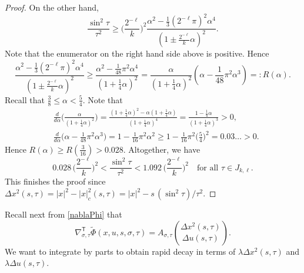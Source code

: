 \documentclass[leqno]{amsart}
\theoremstyle{definition}
\theoremstyle{remark}
\numberwithin{equation}{section}
\newcommand\la{{\lambda}}
\begin{document}
\begin{proof}
On the other hand,
\[
\frac{\sin ^2 \tau}{\tau^2 } \geq\Big(\frac{2^{-\ell}}{k}\Big)^2 \frac{\alpha^2 -\frac{1}{3}(2^{-\ell} \pi)^2 \alpha^{ 4 }}{(1 \pm \frac{2^{-\ell}}{k} \alpha)^2 }.
\]
Note that the enumerator on the right hand side above is positive. Hence
\[
\frac{\alpha^2 -\frac{1}{3}(2^{-\ell} \pi)^2 \alpha^{ 4 }}{(1 \pm \frac{2^{-\ell}}{k} \alpha)^2 }
\geq \frac{\alpha^2 -\frac{1}{48} \pi^2 \alpha^{ 4 }}{(1 + \frac{1}{4} \alpha)^2 }
= \frac{\alpha}{(1 + \frac{1}{4} \alpha)^2 }\left(\alpha-\frac{1}{48} \pi^2 \alpha^{3}\right) = :R(\alpha).
\]
Recall that $\frac{3}{8}\le \alpha < \frac 5 4$. Note that
\[
\begin{aligned}
& \frac{d}{d\alpha} \Big(\frac{\alpha}{ (1 + \frac{1}{4} \alpha)^2 } \Big)
 = \frac{(1 + \frac{1}{4} \alpha)^2 -\alpha(1 + \frac{1}{4} \alpha)}{(1 + \frac{1}{4} \alpha)^{ 4 }} = \frac{1-\frac{1}{4} \alpha}{(1 + \frac{1}{4} \alpha)^{3}} > 0, \\
& \frac{d}{d\alpha} \Big(\alpha-\frac{1}{48} \pi^2 \alpha^{3}\Big)
 = 1-\frac{1}{ 16 } \pi^2 \alpha^2 \geq 1-\frac{1}{ 16 } \pi^2 \Big(\frac{5}{4}\Big)^2 = 0.03 \ldots > 0.
\end{aligned}
\]
Hence $R(\alpha) \geq R\left(\frac{3}{16}\right) > 0.028$. Altogether, we have
\[
0.028 \, \Big(\frac{2^{-\ell}}{k}\Big)^2 < \frac{\sin ^2 \tau}{\tau^2 } < 1.092 \, \Big(\frac{2^{-\ell}}{k}\Big)^2 
\quad\text{for all } \tau \in J_{k,\ell}.
\]
This finishes the proof since $\Delta x^2 (s,\tau) = |x|^2-|x|_{c}^2 (s,\tau) = |x|^2-s \, (\sin^2\tau)/\tau^2$.
\end{proof}

Recall next from \eqref{nablaPhi} that
\[
 \nabla_{\sigma,\tau} ^{\mathsf T}\tilde \Phi (x,u,s,\sigma,\tau)
 = A_{\sigma, \tau}\binom{\Delta x^2 (s,\tau)}{\Delta u(s,\tau)}.
 \]
We want to integrate by parts to obtain rapid decay in terms of $\la\Delta x^2 (s,\tau)$ and $\la\Delta u(s,\tau)$. 
\smallskip
\end{document}
